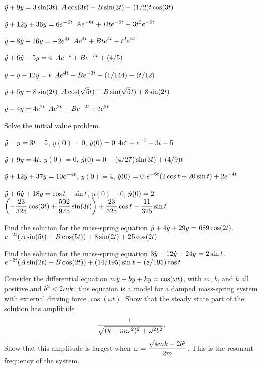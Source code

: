 \exercise $\displaystyle\ddot y +9y=3\sin(3t)$
\answer $\displaystyle A\cos(3t)+B\sin(3t)-(1/2)t\cos(3t)$
\endanswer
\endexercise

\exercise $\displaystyle\ddot y+12\dot y+36y=6e^{-6t}$
\answer $\displaystyle Ae^{-6t}+Bte^{-6t}+3t^2e^{-6t}$
\endanswer
\endexercise

\exercise $\displaystyle\ddot y-8\dot y+16y=-2e^{4t}$
\answer $\displaystyle Ae^{4t}+Bte^{4t}-t^2e^{4t}$
\endanswer
\endexercise

\exercise $\displaystyle\ddot y+6\dot y+5y=4$
\answer $\displaystyle Ae^{-t}+Be^{-5t}+(4/5)$
\endanswer
\endexercise

\exercise $\displaystyle\ddot y-\dot y-12y=t$
\answer $\displaystyle Ae^{4t}+Be^{-3t}+(1/144)-(t/12)$
\endanswer
\endexercise

\exercise $\displaystyle\ddot y+5y=8\sin(2t)$
\answer $\displaystyle A\cos(\sqrt5t)+B\sin(\sqrt5t)+8\sin(2t)$
\endanswer
\endexercise

\exercise $\displaystyle\ddot y-4y=4e^{2t}$
\answer $\displaystyle Ae^{2t}+Be^{-2t}+te^{2t}$
\endanswer
\endexercise

Solve the initial value problem.

\exercise $\displaystyle\ddot y-y=3t+5$, $y(0)=0$, $\displaystyle\dot y(0)=0$
\answer $\displaystyle 4e^{t}+e^{-t}-3t-5$
\endanswer
\endexercise

\exercise $\displaystyle\ddot y+9y=4t$, $y(0)=0$, $\displaystyle\dot y(0)=0$
\answer $\displaystyle -(4/27)\sin(3t)+(4/9)t$
\endanswer
\endexercise

\exercise $\displaystyle\ddot y +12\dot y +37y=10e^{-4t}$, $y(0)=4$, $\displaystyle\dot y(0)=0$
\answer $\displaystyle e^{-6t}(2\cos t+20\sin t)+2e^{-4t}$
\endanswer
\endexercise

\exercise $\displaystyle\ddot y+6\dot y+18y=\cos t-\sin t$, $y(0)=0$, $\displaystyle\dot
y(0)=2$ 
\answer $\displaystyle
\left(-{23\over 325}\cos(3t)+{592\over 975}\sin(3t)\right)+
{23\over325}\cos t-{11\over325}\sin t$
\endanswer
\endexercise

\exercise Find the solution for the mass-spring equation
$\displaystyle\ddot y+4\dot y+29y=689\cos(2t)$.
\answer $\displaystyle e^{-2t}(A\sin(5t)+B\cos(5t))+8\sin(2t)+25\cos(2t)$
\endanswer
\endexercise

\exercise Find the solution for the mass-spring equation
$\displaystyle3\ddot y+12\dot y+24y=2\sin t$.
\answer $\displaystyle e^{-2t}(A\sin(2t)+B\cos(2t))+(14/195)\sin t-(8/195)\cos t$
\endanswer
\endexercise

\exercise Consider the differential 
equation $\displaystyle m\ddot y+b\dot y+ky=\cos(\omega t)$,
with $m$, $b$, and $k$ all positive and $\displaystyle b^2<2mk$; this equation
is a model for a damped mass-spring system with external 
driving force $\cos(\omega t)$.
Show that the steady state part of the solution has amplitude
$${1\over \sqrt{(k-m\omega^2)^2+\omega^2b^2}}.$$
Show that this amplitude is largest when 
$\displaystyle \omega={\sqrt{4mk-2b^2}\over 2m}$. This is the 
{\dfont resonant frequency} of the system.
\endexercise

\endexercises
